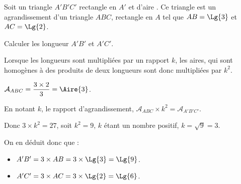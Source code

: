 \begin{exercice*}
    Soit un triangle $A'B'C'$ rectangle en $A'$ et d'aire .
    Ce triangle est un agrandissement d'un triangle $ABC$, rectangle en $A$ tel que $AB=\Lg{3}$ et $AC=\Lg{2}$.

    \medskip
    Calculer les longueur $A'B'$ et $A'C'$.

\end{exercice*}
\begin{corrige}
    Lorsque les longueurs sont multipliées par un rapport $k$, les aires, qui sont homogènes à 
    des produits de deux longueurs sont donc multipliées par $k^2$.

    $\mathcal{A}_{ABC} = \dfrac{3\times 2}{3} = \Aire{3}$.

    En notant $k$, le rapport d'agrandissement, $\mathcal{A}_{ABC} \times k^2 = \mathcal{A}_{A'B'C'}$.

    Donc $3\times k^2 = 27$, soit $k^2 = 9$, $k$ étant un nombre positif, $k = \sqrt{9} = 3$.

    On en déduit donc que :
    \begin{itemize}
        \item $A'B' = 3\times AB = 3 \times \Lg{3} = \Lg{9}$.
        \item $A'C' = 3\times AC = 3 \times \Lg{2} = \Lg{6}$.
    \end{itemize}
\end{corrige}

